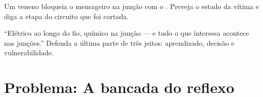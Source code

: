 \begin{exercise}[$\star\star$]\label{exo:g8:nervous-communication:11}
Um veneno bloqueia o mensageiro na junção com o . Preveja o
estado da vítima e diga a etapa do circuito que foi cortada.
\end{exercise}

\begin{exercise}[$\star\star\star$]\label{exo:g8:nervous-communication:12}
``Elétrico ao longo do fio, químico na junção --- e tudo o que
interessa acontece nas junções.'' Defenda a última parte de três
jeitos: aprendizado, decisão e vulnerabilidade.
\end{exercise}

\section{Problema: A bancada do reflexo}


